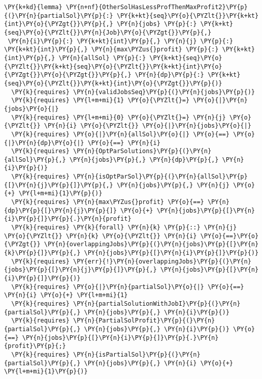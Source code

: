 \begin{Verbatim}[commandchars=\\\{\},fontsize=\footnotesize]
\PY{k+kd}{lemma} \PY{n+nf}{OtherSolHasLessProfThenMaxProfit2}\PY{p}{(}\PY{n}{partialSol}\PY{p}{:} \PY{k+kt}{seq}\PY{o}{\PYZlt{}}\PY{k+kt}{int}\PY{o}{\PYZgt{}}\PY{p}{,} \PY{n}{jobs} \PY{p}{:} \PY{k+kt}{seq}\PY{o}{\PYZlt{}}\PY{n}{Job}\PY{o}{\PYZgt{}}\PY{p}{,}
 \PY{n}{i}\PY{p}{:} \PY{k+kt}{int}\PY{p}{,} \PY{n}{j} \PY{p}{:} \PY{k+kt}{int}\PY{p}{,} \PY{n}{max\PYZus{}profit} \PY{p}{:} \PY{k+kt}{int}\PY{p}{,} \PY{n}{allSol} \PY{p}{:} \PY{k+kt}{seq}\PY{o}{\PYZlt{}}\PY{k+kt}{seq}\PY{o}{\PYZlt{}}\PY{k+kt}{int}\PY{o}{\PYZgt{}}\PY{o}{\PYZgt{}}\PY{p}{,} \PY{n}{dp}\PY{p}{:} \PY{k+kt}{seq}\PY{o}{\PYZlt{}}\PY{k+kt}{int}\PY{o}{\PYZgt{}}\PY{p}{)}
  \PY{k}{requires} \PY{n}{validJobsSeq}\PY{p}{(}\PY{n}{jobs}\PY{p}{)}
  \PY{k}{requires} \PY{l+m+mi}{1} \PY{o}{\PYZlt{}=} \PY{o}{|}\PY{n}{jobs}\PY{o}{|}
  \PY{k}{requires} \PY{l+m+mi}{0} \PY{o}{\PYZlt{}=} \PY{n}{j} \PY{o}{\PYZlt{}} \PY{n}{i} \PY{o}{\PYZlt{}} \PY{o}{|}\PY{n}{jobs}\PY{o}{|}
  \PY{k}{requires} \PY{o}{|}\PY{n}{allSol}\PY{o}{|} \PY{o}{==} \PY{o}{|}\PY{n}{dp}\PY{o}{|} \PY{o}{==} \PY{n}{i} 
  \PY{k}{requires} \PY{n}{OptParSolutions}\PY{p}{(}\PY{n}{allSol}\PY{p}{,} \PY{n}{jobs}\PY{p}{,} \PY{n}{dp}\PY{p}{,} \PY{n}{i}\PY{p}{)}
  \PY{k}{requires} \PY{n}{isOptParSol}\PY{p}{(}\PY{n}{allSol}\PY{p}{[}\PY{n}{j}\PY{p}{]}\PY{p}{,} \PY{n}{jobs}\PY{p}{,} \PY{n}{j} \PY{o}{+} \PY{l+m+mi}{1}\PY{p}{)}
  \PY{k}{requires} \PY{n}{max\PYZus{}profit} \PY{o}{==} \PY{n}{dp}\PY{p}{[}\PY{n}{j}\PY{p}{]} \PY{o}{+} \PY{n}{jobs}\PY{p}{[}\PY{n}{i}\PY{p}{]}\PY{p}{.}\PY{n}{profit} 
  \PY{k}{requires} \PY{k}{forall} \PY{n}{k} \PY{p}{::} \PY{n}{j} \PY{o}{\PYZlt{}} \PY{n}{k} \PY{o}{\PYZlt{}} \PY{n}{i} \PY{o}{==}\PY{o}{\PYZgt{}} \PY{n}{overlappingJobs}\PY{p}{(}\PY{n}{jobs}\PY{p}{[}\PY{n}{k}\PY{p}{]}\PY{p}{,} \PY{n}{jobs}\PY{p}{[}\PY{n}{i}\PY{p}{]}\PY{p}{)}
  \PY{k}{requires} \PY{err}{!}\PY{n}{overlappingJobs}\PY{p}{(}\PY{n}{jobs}\PY{p}{[}\PY{n}{j}\PY{p}{]}\PY{p}{,} \PY{n}{jobs}\PY{p}{[}\PY{n}{i}\PY{p}{]}\PY{p}{)}
  \PY{k}{requires} \PY{o}{|}\PY{n}{partialSol}\PY{o}{|} \PY{o}{==} \PY{n}{i} \PY{o}{+} \PY{l+m+mi}{1}
  \PY{k}{requires} \PY{n}{partialSolutionWithJobI}\PY{p}{(}\PY{n}{partialSol}\PY{p}{,} \PY{n}{jobs}\PY{p}{,} \PY{n}{i}\PY{p}{)}
  \PY{k}{requires} \PY{n}{PartialSolProfit}\PY{p}{(}\PY{n}{partialSol}\PY{p}{,} \PY{n}{jobs}\PY{p}{,} \PY{n}{i}\PY{p}{)} \PY{o}{==} \PY{n}{jobs}\PY{p}{[}\PY{n}{i}\PY{p}{]}\PY{p}{.}\PY{n}{profit}\PY{p}{;}
  \PY{k}{requires} \PY{n}{isPartialSol}\PY{p}{(}\PY{n}{partialSol}\PY{p}{,} \PY{n}{jobs}\PY{p}{,} \PY{n}{i} \PY{o}{+} \PY{l+m+mi}{1}\PY{p}{)}

\end{Verbatim}
